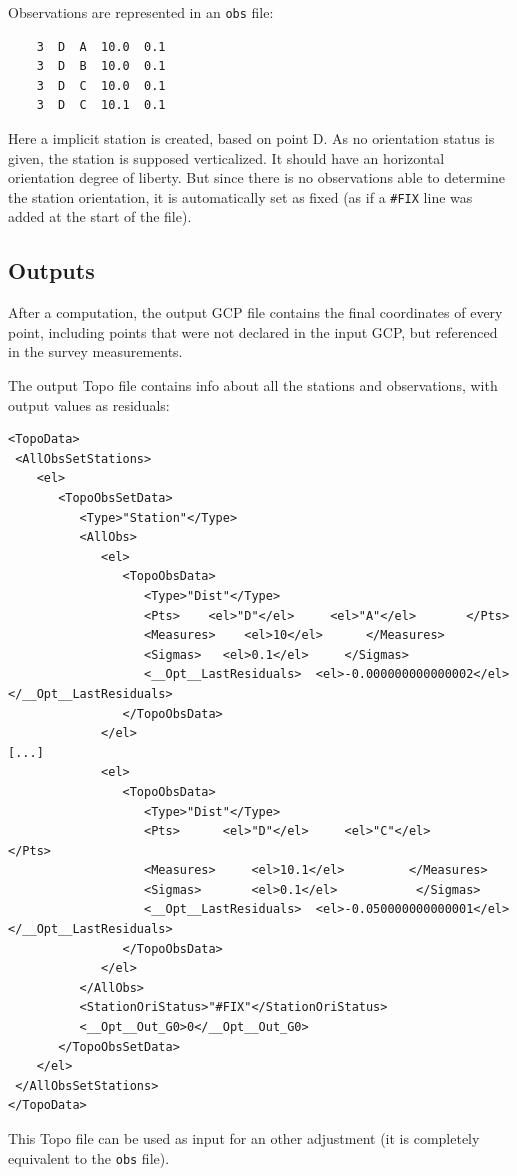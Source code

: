 Observations are represented in an {\tt obs} file:
\begin{lstlisting}
    3  D  A  10.0  0.1
    3  D  B  10.0  0.1
    3  D  C  10.0  0.1
    3  D  C  10.1  0.1
\end{lstlisting}

Here a implicit station is created, based on point D.
As no orientation status is given, the station is supposed verticalized.
It should have an horizontal orientation degree of liberty.
But since there is no observations able to determine the station orientation,
it is automatically set as fixed (as if a {\tt \#FIX} line was added at the start of the file).

\subsection{Outputs}

After a computation, the output GCP file contains the final coordinates of every point, including
points that were not declared in the input GCP, but referenced in the survey measurements.

The output Topo file contains info about all the stations and observations,
with output values as residuals:

\begin{lstlisting}
<TopoData>
 <AllObsSetStations>
    <el>
       <TopoObsSetData>
          <Type>"Station"</Type>
          <AllObs>
             <el>
                <TopoObsData>
                   <Type>"Dist"</Type>
                   <Pts>    <el>"D"</el>     <el>"A"</el>       </Pts>
                   <Measures>    <el>10</el>      </Measures>
                   <Sigmas>   <el>0.1</el>     </Sigmas>
                   <__Opt__LastResiduals>  <el>-0.000000000000002</el>  </__Opt__LastResiduals>
                </TopoObsData>
             </el>
[...]
             <el>
                <TopoObsData>
                   <Type>"Dist"</Type>
                   <Pts>      <el>"D"</el>     <el>"C"</el>          </Pts>
                   <Measures>     <el>10.1</el>         </Measures>
                   <Sigmas>       <el>0.1</el>           </Sigmas>
                   <__Opt__LastResiduals>  <el>-0.050000000000001</el>  </__Opt__LastResiduals>
                </TopoObsData>
             </el>
          </AllObs>
          <StationOriStatus>"#FIX"</StationOriStatus>
          <__Opt__Out_G0>0</__Opt__Out_G0>
       </TopoObsSetData>
    </el>
 </AllObsSetStations>
</TopoData>
\end{lstlisting}

This Topo file can be used as input for an other adjustment (it is completely equivalent to the {\tt obs} file).
